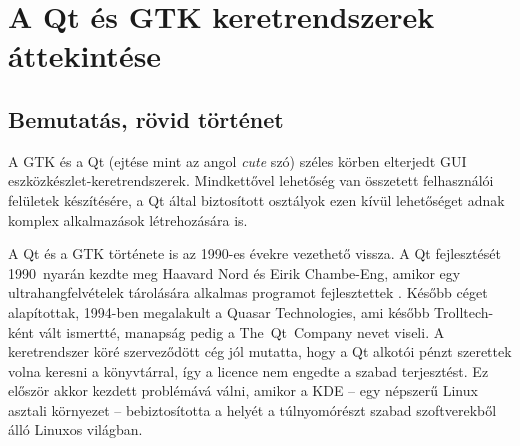 
\chapter{A Qt és GTK keretrendszerek áttekintése}\label{sect:qtgtkoverview}


\section{Bemutatás, rövid történet}
A GTK és a Qt (ejtése mint az angol \textit{cute} szó) széles körben elterjedt GUI eszközkészlet-keretrendszerek. Mindkettővel lehetőség van összetett felhasználói felületek készítésére, a Qt által biztosított osztályok ezen kívül lehetőséget adnak komplex alkalmazások létrehozására is.

A Qt és a GTK története is az 1990-es évekre vezethető vissza. A Qt fejlesztését 1990~nyarán kezdte meg Haavard Nord és Eirik Chambe-Eng, amikor egy ultrahangfelvételek tárolására alkalmas programot fejlesztettek \cite{QtWiki}. Később céget alapítottak, 1994-ben megalakult a Quasar Technologies, ami később Trolltech-ként vált ismertté, manapság pedig a The~Qt~Company nevet viseli. A keretrendszer köré szerveződött cég jól mutatta, hogy a Qt alkotói pénzt szerettek volna keresni a könyvtárral, így a licence nem engedte a szabad terjesztést. Ez először akkor kezdett problémává válni, amikor a KDE -- egy népszerű Linux asztali környezet -- bebiztosította a helyét a túlnyomórészt szabad szoftverekből álló Linuxos világban.

